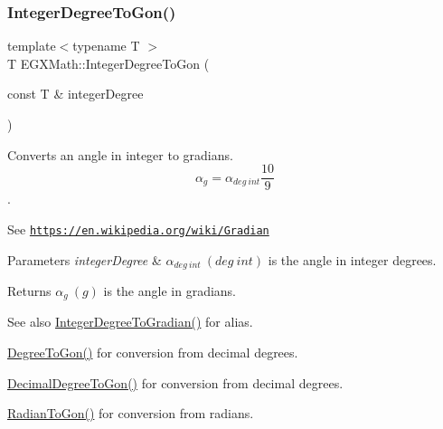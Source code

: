 \subsubsection{\texorpdfstring{Integer\+Degree\+To\+Gon()}{IntegerDegreeToGon()}}
{\footnotesize\ttfamily template$<$typename T $>$ \\
T E\+G\+X\+Math\+::\+Integer\+Degree\+To\+Gon (\begin{DoxyParamCaption}\item[{const T \&}]{integer\+Degree }\end{DoxyParamCaption})}



Converts an angle in integer to gradians. \[\alpha_{g}=\alpha_{deg\ int}\frac{10}{9}\]. 

See \href{https://en.wikipedia.org/wiki/Gradian}{\tt https\+://en.\+wikipedia.\+org/wiki/\+Gradian} 
\begin{DoxyParams}{Parameters}
{\em integer\+Degree} & $\alpha_{deg\ int}\ (deg\ int)$ is the angle in integer degrees. \\
\hline
\end{DoxyParams}
\begin{DoxyReturn}{Returns}
$\alpha_{g}\ (g)$ is the angle in gradians. 
\end{DoxyReturn}
\begin{DoxySeeAlso}{See also}
\mbox{\hyperlink{group___e_g_x_math-_angle_conversions-_integer_degree_ga47127467ff7a8ef57f6be9ce496a97df}{Integer\+Degree\+To\+Gradian()}} for alias. 

\mbox{\hyperlink{group___e_g_x_math-_angle_conversions-_degree_ga87c3fab0867021e5d2501197b4db6194}{Degree\+To\+Gon()}} for conversion from decimal degrees. 

\mbox{\hyperlink{group___e_g_x_math-_angle_conversions-_decimal_degree_gaeb333a1ad0aeb913c025fbd1be85fcb3}{Decimal\+Degree\+To\+Gon()}} for conversion from decimal degrees. 

\mbox{\hyperlink{group___e_g_x_math-_angle_conversions-_radian_ga36912e5a810b64c271c4dafc17f4ca45}{Radian\+To\+Gon()}} for conversion from radians. 
\end{DoxySeeAlso}
\mbox{\label{group___e_g_x_math-_angle_conversions-_integer_degree_ga47127467ff7a8ef57f6be9ce496a97df}} 
